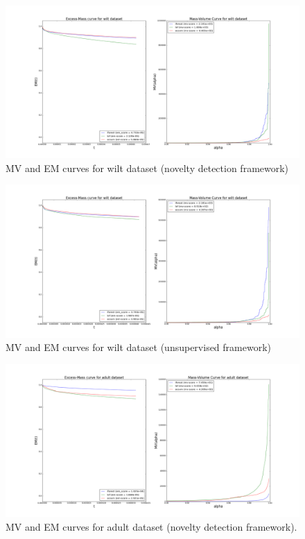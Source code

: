\begin{figure}[!ht]
\label{evaluation:mv_em_wilt}
  \centering
  \caption{MV and EM curves for wilt dataset (novelty detection framework)}
  \includegraphics[trim=172 52 165 70, clip, width=\linewidth]{fig_source/evaluation_fig/mv_em_wilt_supervised_09_factorized.png}
\end{figure}
\begin{figure}[!ht]
\label{evaluation:mv_em_wilt_unsupervised}
  \centering
  \caption{MV and EM curves for wilt dataset (unsupervised framework)}
  \includegraphics[trim=172 52 165 70, clip, width=\linewidth]{fig_source/evaluation_fig/mv_em_wilt_unsupervised_09_factorized.png}
\end{figure}



\begin{figure}[!ht]
  \centering
  \caption{MV and EM curves for adult dataset (novelty detection framework).}
  \includegraphics[trim=172 52 165 70, clip, width=\linewidth]{fig_source/evaluation_fig/mv_em_adult_supervised_09_factorized.png}
\end{figure}


